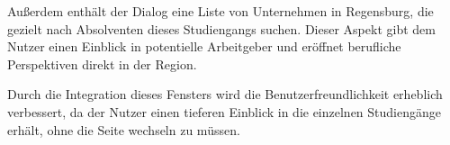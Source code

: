 Außerdem enthält der Dialog eine Liste von Unternehmen in Regensburg, die
gezielt nach Absolventen dieses Studiengangs suchen. Dieser Aspekt gibt dem
Nutzer einen Einblick in potentielle Arbeitgeber und eröffnet berufliche
Perspektiven direkt in der Region.

Durch die Integration dieses Fensters wird die Benutzerfreundlichkeit erheblich 
verbessert, da der Nutzer einen tieferen Einblick in die einzelnen Studiengänge
erhält, ohne die Seite wechseln zu müssen.



